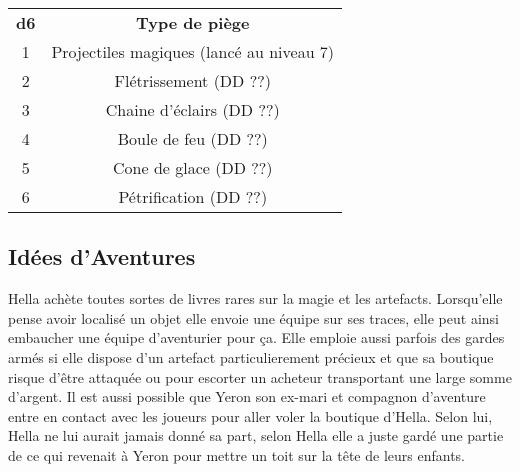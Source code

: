 \begin{table} [h]
    \setlength{\tabcolsep}{4pt}
    \center
\begin{tabular}{cc}
  \bf d6 & \bf Type de piège \\
   \rowcolor{LightCyan}
  1 & Projectiles magiques (lancé au niveau 7) \\
  2 & Flétrissement (DD ??)\\
   \rowcolor{LightCyan}
  3 & Chaine d'éclairs (DD ??)\\
  4 & Boule de feu  (DD ??)\\
   \rowcolor{LightCyan}
  5 & Cone de glace (DD ??)\\
  6 & Pétrification (DD ??)\\
\end{tabular}
    \setlength{\tabcolsep}{6pt}
\end{table}

\subsection{Idées d'Aventures}

Hella achète toutes sortes de livres rares sur la magie et les artefacts.
Lorsqu'elle pense avoir localisé un objet elle envoie une équipe sur ses 
traces, elle peut ainsi embaucher une équipe d'aventurier pour ça. Elle 
emploie aussi parfois des gardes armés si elle dispose d'un artefact 
particulierement précieux et que sa boutique risque d'être attaquée ou pour 
escorter un acheteur transportant une large somme d'argent. 
Il est aussi possible que Yeron son ex-mari et compagnon d'aventure entre 
en contact avec les joueurs pour aller voler la boutique d'Hella. Selon lui,
Hella ne lui aurait jamais donné sa part, selon Hella elle a juste gardé une 
partie de ce qui revenait à Yeron pour mettre un toit sur la tête de leurs 
enfants.

